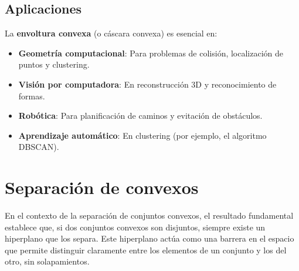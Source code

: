 \documentclass[12pt]{book}
\newtheorem{theorem}{Teorema}
\theoremstyle{definition}
\theoremstyle{plain}
\theoremstyle{remark}
\begin{document}


\subsection{Aplicaciones}


La \textbf{envoltura convexa} (o cáscara convexa) %
es esencial en:

\begin{itemize}
    \item \textbf{Geometría computacional}: Para problemas de colisión, localización de puntos y clustering.
    \item \textbf{Visión por computadora}: En reconstrucción 3D y reconocimiento de formas.
    \item \textbf{Robótica}: Para planificación de caminos y evitación de obstáculos.
    \item \textbf{Aprendizaje automático}: En clustering (por ejemplo, el algoritmo DBSCAN).
\end{itemize}


\section{Separación de convexos}

En el contexto de la separación de conjuntos convexos, el resultado fundamental establece que, si dos conjuntos convexos son disjuntos, siempre existe un hiperplano que los separa. Este hiperplano actúa como una barrera en el espacio que permite distinguir claramente entre los elementos de un conjunto y los del otro, sin solapamientos. 
\end{document}
